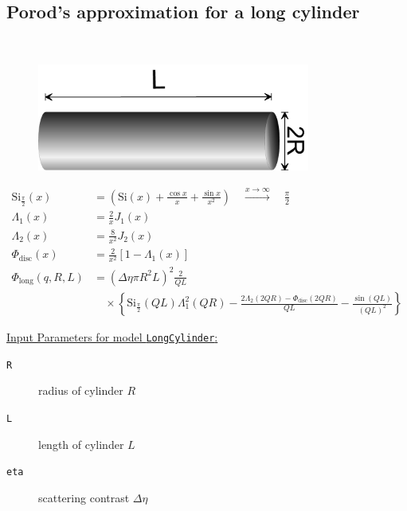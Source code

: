 \clearpage
\subsection{Porod's approximation for a long cylinder \cite{Porod1948}}
\label{sect:LongCylinder}
~\\

\begin{figure}[htb]
\begin{center}
\includegraphics[width=0.8\textwidth,height=0.315\textwidth]{../images/form_factor/cylindrical_obj/long_cylinder.png}
\end{center}
\caption{} \label{longcylinder}
\end{figure}

\begin{align}
\text{Si}_\frac{\pi}{2}(x) &= \left( \text{Si}(x)+\frac{\cos
x}{x}+\frac{\sin x}{x^2} \right)
\quad \xrightarrow{x \rightarrow\infty} \quad \frac{\pi}{2} \\
\Lambda_1(x) &= \frac{2}{x} J_1(x) \\
\Lambda_2(x) &= \frac{8}{x^2} J_2(x) \\
\Phi_\text{disc}(x) &= \frac{2}{x^2}
\left[1-\Lambda_1(x)\right] \\
\Phi_\text{long}(q,R,L) &= \left(\Delta\eta\pi
R^2L\right)^2 \frac{2}{QL}  \label{eq:LongCylinder}\\
& \quad \times \left\{\text{Si}_\frac{\pi}{2}(QL)
\Lambda_1^2(QR)-\frac{2\Lambda_2(2QR)-\Phi_\text{disc}(2QR)}{QL}-\frac{\sin(QL)}{(QL)^2}\right\}\nonumber
\end{align}


\vspace{5mm}

\underline{Input Parameters for model \texttt{LongCylinder}:}
\begin{description}
\item[\texttt{R}] radius of cylinder $R$
\item[\texttt{L}] length of cylinder $L$
\item[\texttt{eta}] scattering contrast $\Delta\eta$
\end{description}

